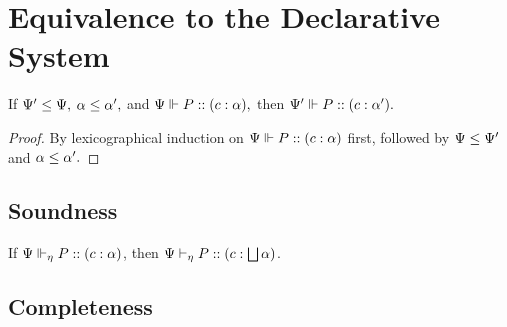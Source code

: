 
\section{Equivalence to the Declarative System}

\begin{lemma}[Subtyping]
  \label{bi-sub}
  If $\Psi' \le \Psi,$ $\alpha \le \alpha',$ and $\Psi \Vdash P :: (c : \alpha),$ then $\Psi' \Vdash P :: (c : \alpha').$
\end{lemma}
\begin{proof}
  By lexicographical induction on $\Psi \Vdash P :: (c : \alpha)$ first, followed by $\Psi \le \Psi'$ and $\alpha \le \alpha'.$
\end{proof}

\subsection{Soundness}

\begin{theorem}
  If ${\Psi} \Vdash_{\eta} P :: (c : \alpha)$, then ${\Psi} \vdash_{\eta} P :: (c : \bigsqcup{\alpha})$.

\end{theorem}


\subsection{Completeness}

